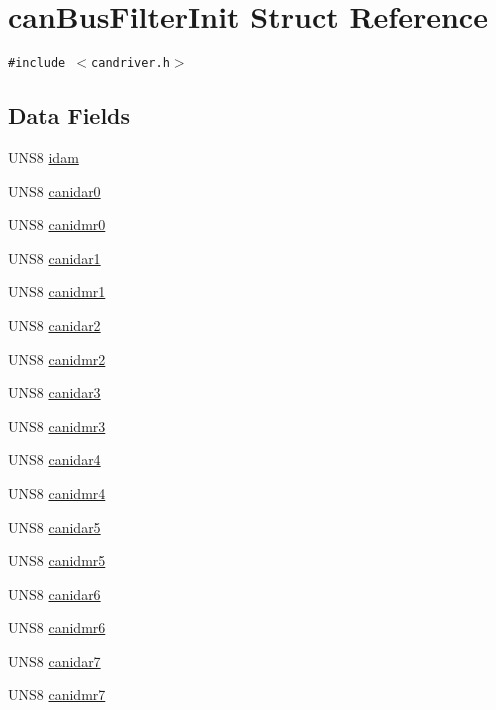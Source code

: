 \hypertarget{structcanBusFilterInit}{
\section{can\-Bus\-Filter\-Init Struct Reference}
\label{structcanBusFilterInit}
}
{\tt \#include $<$candriver.h$>$}

\subsection*{Data Fields}
\begin{CompactItemize}
\item 
UNS8 \hyperlink{structcanBusFilterInit_bd65e55b40839cc85917717124ba8ff7}{idam}
\item 
UNS8 \hyperlink{structcanBusFilterInit_e73e4472088781055b2c634529a6c91e}{canidar0}
\item 
UNS8 \hyperlink{structcanBusFilterInit_73219612204df8b0eece12ebf4fbb491}{canidmr0}
\item 
UNS8 \hyperlink{structcanBusFilterInit_c78d28e662944187916a14991d118dda}{canidar1}
\item 
UNS8 \hyperlink{structcanBusFilterInit_612d35c1dda338351f6da31935ff95fd}{canidmr1}
\item 
UNS8 \hyperlink{structcanBusFilterInit_a16d44afd060e1c3ebf5cf66b2e8f9c4}{canidar2}
\item 
UNS8 \hyperlink{structcanBusFilterInit_c5f7826dc1ec90e292f04ab1cb073a38}{canidmr2}
\item 
UNS8 \hyperlink{structcanBusFilterInit_0fd991a6f82c304f53acf589d4057133}{canidar3}
\item 
UNS8 \hyperlink{structcanBusFilterInit_b4edcd131fa7b019f6dff0c1a5b68ce3}{canidmr3}
\item 
UNS8 \hyperlink{structcanBusFilterInit_083024dc3a47331c1d8914d863fa6d87}{canidar4}
\item 
UNS8 \hyperlink{structcanBusFilterInit_a8615d16f68111163e5175543135b896}{canidmr4}
\item 
UNS8 \hyperlink{structcanBusFilterInit_8498a6166aa348baa5d5cc32e07bffb9}{canidar5}
\item 
UNS8 \hyperlink{structcanBusFilterInit_5f0904c30b658b4a4ad59a8414df2e93}{canidmr5}
\item 
UNS8 \hyperlink{structcanBusFilterInit_2194ca3ae6d6613b4f9a0db939661f0b}{canidar6}
\item 
UNS8 \hyperlink{structcanBusFilterInit_590926f6af0adac2fdce41d43d77fc61}{canidmr6}
\item 
UNS8 \hyperlink{structcanBusFilterInit_5c00e7405a498d9eb55816573f12c125}{canidar7}
\item 
UNS8 \hyperlink{structcanBusFilterInit_cde13291ed4cd72f9818efeb50a254fd}{canidmr7}
\end{CompactItemize}


